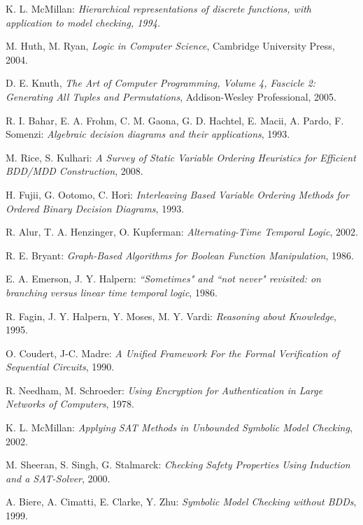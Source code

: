 \documentclass[11pt]{report}
\begin{document}
\begin{thebibliography}{9}
K. L. McMillan:\textit{ Hierarchical representations of discrete functions, with application to model checking, 1994.
}

 M. Huth, M. Ryan, 
\emph{Logic in Computer Science},
Cambridge University Press, 2004.

 D. E. Knuth, \textit{The Art of Computer Programming, Volume
4, Fascicle 2: Generating All Tuples and Permutations}, Addison-Wesley Professional, 2005.

  R. I. Bahar, E. A. Frohm, C. M. Gaona, G. D. Hachtel, E. Macii, A. Pardo, F. Somenzi:\textit{
Algebraic decision diagrams and their applications}, 1993.

 M. Rice, S. Kulhari:\textit{ A Survey of Static Variable Ordering Heuristics for Efficient BDD/MDD Construction}, 2008.

 H. Fujii, G. Ootomo, C. Hori: \textit{Interleaving Based Variable Ordering Methods for Ordered Binary Decision Diagrams}, 1993.

 R. Alur, T. A. Henzinger, O. Kupferman: \textit{Alternating-Time Temporal Logic}, 2002.

 R. E. Bryant: \textit{Graph-Based Algorithms
for Boolean Function Manipulation}, 1986.

  	E. A. Emerson, J. Y. Halpern:\textit{
``Sometimes" and ``not never" revisited: on branching versus linear time temporal logic}, 1986.
	
R. Fagin, J. Y. Halpern, Y. Moses, M. Y. Vardi: \textit{Reasoning about Knowledge}, 1995.

 O. Coudert, J-C. Madre: \textit{A Unified Framework For the Formal Verification of Sequential Circuits}, 1990.

 R. Needham, M. Schroeder: \textit{Using Encryption for Authentication in Large Networks of Computers}, 1978.

 K. L. McMillan: \textit{Applying SAT Methods in Unbounded Symbolic Model Checking}, 2002. 

 M. Sheeran, S. Singh, G. Stalmarck: \textit{Checking Safety Properties Using Induction
and a SAT-Solver}, 2000.

 A. Biere, A. Cimatti, E. Clarke, Y. Zhu: \textit{Symbolic Model Checking without BDDs}, 1999. 


\end{thebibliography}
\end{document}
